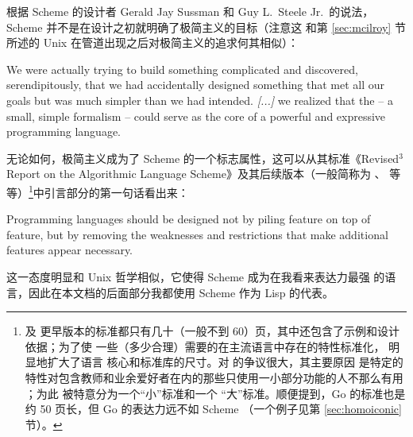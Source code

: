 根据 Scheme 的设计者 Gerald Jay Sussman 和 Guy L.\ Steele Jr.\ 的说法，%
Scheme 并不是在设计之初就明确了极简主义的目标（注意这
和第 \ref{sec:mcilroy} 节所述的 Unix 在管道出现之后对极简主义的追求何其相似）：
\begin{quoting}
	We were actually trying to build something complicated
	and discovered, serendipitously, that we had accidentally
	designed something that met all our goals but was much simpler
	than we had intended.  \emph{[...]} we realized that the
	 -- a small, simple formalism --
	could serve as the core of a powerful and expressive programming language.
\end{quoting}
无论如何，极简主义成为了 Scheme 的一个标志属性，这可以从其标准《Revised$^3$
Report on the Algorithmic Language Scheme》及其后续版本（一般简称为 、%
 等等）\footnote{\label{fn:r6rs} 及
更早版本的标准都只有几十（一般不到 60）页，其中还包含了示例和设计依据；为了使
一些（多少合理）需要的在主流语言中存在的特性标准化， 明显地扩大了语言
核心和标准库的尺寸。对  的争议很大，其主要原因
是特定的特性对包含教师和业余爱好者在内的那些只使用一小部分功能的人不那么有用%
；为此 被特意分为一个“小”标准和一个
“大”标准。顺便提到，Go 的标准也是约 50 页长，但 Go 的表达力远不如 Scheme%
（一个例子见第 \ref{sec:homoiconic} 节）。}中引言部分的第一句话看出来：
\begin{quoting}
	Programming languages should be designed not by piling
	feature on top of feature, but by removing the weaknesses and
	restrictions that make additional features appear necessary.
\end{quoting}
这一态度明显和 Unix 哲学相似，它使得 Scheme 成为在我看来表达力最强
的语言，因此在本文档的后面部分我都使用 Scheme 作为 Lisp 的代表。

